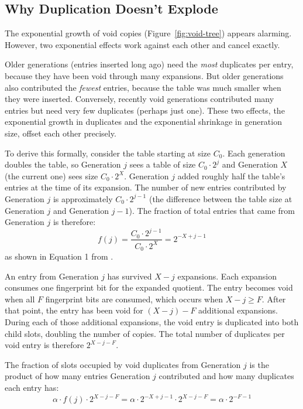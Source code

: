 \subsection{Why Duplication Doesn't Explode}

The exponential growth of void copies (Figure~\ref{fig:void-tree}) 
appears alarming. However, two exponential effects work against each 
other and cancel exactly.

Older generations (entries inserted long ago) need the \emph{most} 
duplicates per entry, because they have been void through many 
expansions. But older generations also contributed the \emph{fewest} 
entries, because the table was much smaller when they were inserted. 
Conversely, recently void generations contributed many entries but 
need very few duplicates (perhaps just one). These two effects, 
the exponential growth in duplicates and the exponential shrinkage 
in generation size, offset each other precisely.

To derive this formally, consider the table starting at size $C_0$. 
Each generation doubles the table, so Generation $j$ sees a table 
of size $C_0 \cdot 2^j$ and Generation $X$ (the current one) sees 
size $C_0 \cdot 2^X$. Generation $j$ added roughly half the table's 
entries at the time of its expansion. The number of new entries 
contributed by Generation $j$ is approximately $C_0 \cdot 2^{j-1}$ 
(the difference between the table size at Generation $j$ and 
Generation $j-1$). The fraction of total entries that came from 
Generation $j$ is therefore:
\[
  f(j) = \frac{C_0 \cdot 2^{j-1}}{C_0 \cdot 2^X} = 2^{-X+j-1}
\]
as shown in Equation 1 from \cite{aleph}.

An entry from Generation $j$ has survived $X - j$ expansions. Each 
expansion consumes one fingerprint bit for the expanded quotient. 
The entry becomes void when all $F$ fingerprint bits are consumed, 
which occurs when $X - j \geq F$. After that point, the entry has 
been void for $(X - j) - F$ additional expansions. During each of 
those additional expansions, the void entry is duplicated into both 
child slots, doubling the number of copies. The total number of 
duplicates per void entry is therefore $2^{X - j - F}$.

The fraction of slots occupied by void duplicates from Generation 
$j$ is the product of how many entries Generation $j$ contributed 
and how many duplicates each entry has:
\begin{equation}
  \alpha \cdot f(j) \cdot 2^{X-j-F} 
  = \alpha \cdot 2^{-X+j-1} \cdot 2^{X-j-F} 
  = \alpha \cdot 2^{-F-1}
  \label{eq:void-fraction}
\end{equation}

